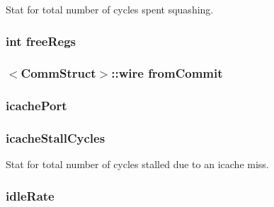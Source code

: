 \label{classFrontEnd_ae1b92a3469ac6b00fddd788b71f64c9a}
Stat for total number of cycles spent squashing. \hypertarget{classFrontEnd_a6c1923b44f74e7cc11aeae29d9c1ec71}{
\subsubsection[{freeRegs}]{\setlength{\rightskip}{0pt plus 5cm}int {\bf freeRegs}}}
\label{classFrontEnd_a6c1923b44f74e7cc11aeae29d9c1ec71}
\hypertarget{classFrontEnd_a77bf6c956edddf1d551d5371ff72162e}{
\subsubsection[{fromCommit}]{$<${\bf CommStruct}$>$::wire {\bf fromCommit}}}
\label{classFrontEnd_a77bf6c956edddf1d551d5371ff72162e}
\hypertarget{classFrontEnd_a290723656a84b9cc90dfce377af9aad0}{
\subsubsection[{icachePort}]{ {\bf icachePort}}}
\label{classFrontEnd_a290723656a84b9cc90dfce377af9aad0}
\hypertarget{classFrontEnd_a2b9328bdb1a6898bfae824981cd64311}{
\subsubsection[{icacheStallCycles}]{ {\bf icacheStallCycles}}}
\label{classFrontEnd_a2b9328bdb1a6898bfae824981cd64311}
Stat for total number of cycles stalled due to an icache miss. \hypertarget{classFrontEnd_a4b942e4ec6b8c1d29a1c96e901ea71dd}{
\subsubsection[{idleRate}]{ {\bf idleRate}}}
